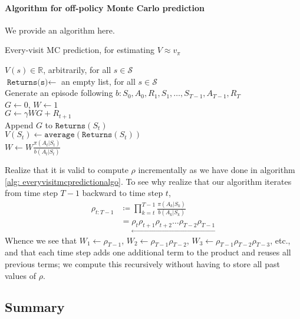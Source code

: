 \documentclass[12pt]{article}
\begin{document}
\paragraph{Algorithm for off-policy Monte Carlo prediction} We provide an algorithm here.
\begin{algorithm}[h]
  \caption{Every-visit MC prediction, for estimating $V \approx v_\pi$}
  $V(s) \in \mathbb R$, arbitrarily, for all $s \in \mathcal S$ \\
  $\texttt{Returns(s)} \gets $ an empty list, for all $s \in \mathcal S$ \\
   {
    Generate an episode following $b: S_0, A_0, R_1, S_1, \ldots, S_{T-1},     A_{T-1}, R_T$ \\
$G \gets 0$, $W \gets 1$ \\
     {
      $G \gets \gamma WG + R_{t+1}$ \\
      Append $G$ to $\texttt{Returns}(S_t)$ \\
      $V(S_t) \gets \texttt{average}(\texttt{Returns}(S_t))$ \\
      $W \gets W \frac{\pi(A_t|S_t)}{b(A_t|S_t)}$
    }
  }
  \label{alg: everyvisitmcpredictionalgo}
\end{algorithm}

Realize that it is valid to compute $\rho$ incrementally as we have done in algorithm \ref{alg: everyvisitmcpredictionalgo}. To see why realize that our algorithm iterates from time step $T-1$ backward to time step $t$,
\begin{align*}
  \rho_{t:T-1} &\coloneqq \prod_{k=t}^{T-1} \frac{\pi(A_k|S_k)}{b(A_k|S_k)} \\
               &= \underset{\longleftarrow}{\rho_t \rho_{t+1} \rho_{t+2} \ldots \rho_{T-2} \rho_{T-1}}
\end{align*}
Whence we see that $W_1 \gets \rho_{T-1}$, $W_2 \gets \rho_{T-1} \rho_{T-2}$, $W_3 \gets \rho_{T-1} \rho_{T-2} \rho_{T-3}$, etc., and that each time step adds one additional term to the product and reuses all previous terms; we compute this recursively without having to store all past values of $\rho$.

\subsection{Summary}
\end{document}
